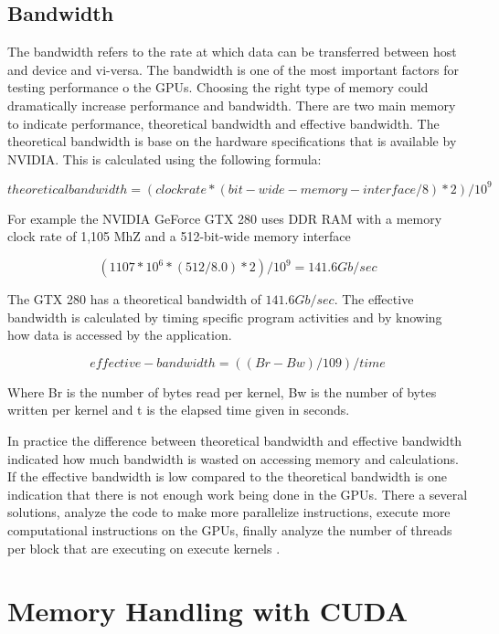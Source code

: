 \subsection{Bandwidth}

The bandwidth refers to the rate at which data can be transferred between host and device and vi-versa. The bandwidth is one of the most important factors for testing performance o the GPUs. Choosing the right type of memory could dramatically increase performance and bandwidth. There are two main memory to indicate performance, theoretical bandwidth and effective bandwidth. The theoretical bandwidth is base on the hardware specifications that is available by NVIDIA. This is calculated using the following formula:

$$ theoretical bandwidth = (clock rate * (bit-wide-memory-interface / 8 )*2) / 10^9 $$

For example the NVIDIA GeForce GTX 280 uses DDR RAM with a memory clock rate of 1,105 MhZ and a 512-bit-wide memory interface

$$ (1107 * 10^6 * (512/8.0) *2 )/10^9 = 141.6 Gb /sec$$

The GTX 280 has a theoretical bandwidth of $141.6Gb/sec$.
The effective bandwidth is calculated by timing specific program activities and by knowing how data is accessed by the application. \cite{practices}

$$effective-bandwidth = ((Br - Bw) / 109 )/time$$

Where Br is the number of bytes read per kernel, Bw is the number of bytes written per kernel and  t is the elapsed time given in seconds.  \cite{fortran}

In practice the difference between theoretical bandwidth and effective bandwidth indicated how much bandwidth is wasted on accessing memory and calculations. If the effective bandwidth is low compared to the theoretical bandwidth is one indication that there is not enough work being done in the GPUs. There a several solutions, analyze the code to make more parallelize instructions, execute more computational instructions on the GPUs, finally analyze the number of threads per block that are executing on execute kernels .


\section{Memory Handling with CUDA}

